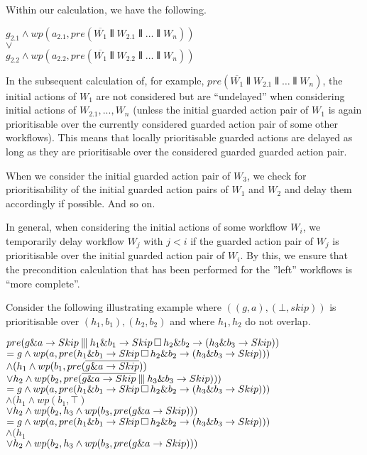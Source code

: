 \documentclass[11pt]{article}
\begin{document}
Within our calculation, we have the following. 

\noindent
$g_{2.1} \land wp(a_{2.1} , pre(\overline{W_1} \interleave W_{2.1} \interleave \dots \interleave W_n))$ \\
$\lor$ \\
$g_{2.2} \land wp(a_{2.2} , pre(\overline{W_1} \interleave W_{2.2} \interleave \dots \interleave W_n))$

In the subsequent calculation of, for example, $pre(\overline{W_1} \interleave W_{2.1} \interleave \dots \interleave W_n)$, the initial actions of $W_1$ are not considered but are ``undelayed'' when considering initial actions of $W_{2.1}, ..., W_n$ (unless the initial guarded action pair of $W_1$ is again prioritisable over the currently considered guarded action pair of some other workflows). This means that locally prioritisable guarded actions are delayed as long as they are prioritisable over the considered guarded guarded action pair.

When we consider the initial guarded action pair of $W_3$, we check for prioritisability of the initial guarded action pairs of $W_1$ and $W_2$ and delay them accordingly if possible. And so on.

In general, when considering the initial actions of some workflow $W_i$, we temporarily delay workflow $W_j$ with $j<i$ if the guarded action pair of $W_j$ is prioritisable over the initial guarded action pair of $W_i$. By this, we ensure that the precondition calculation that has been performed for the ''left'' workflows is ``more complete''.

Consider the following illustrating example where $((g,a),(\bot,skip))$ is prioritisable over $(h_1,b_1),(h_2,b_2)$ and where $h_1,h_2$ do not overlap.

\noindent
$pre(g \& a \rightarrow Skip \interleave h_1 \& b_1 \rightarrow Skip \, \Box \, h_2 \& b_2 \rightarrow (h_3 \& b_3 \rightarrow Skip))$ \\
$= g \land wp(a,pre(h_1 \& b_1 \rightarrow Skip \, \Box \, h_2 \& b_2 \rightarrow (h_3 \& b_3 \rightarrow Skip)))$ \\
$\land (h_1 \land wp(b_1,pre(\overline{g \& a \rightarrow Skip}))$ \\
\hspace*{10pt}$\lor h_2 \land wp(b_2,pre(\overline{g \& a \rightarrow Skip} \interleave h_3 \& b_3 \rightarrow Skip)))$ \\
$= g \land wp(a,pre(h_1 \& b_1 \rightarrow Skip \, \Box \, h_2 \& b_2 \rightarrow (h_3 \& b_3 \rightarrow Skip)))$ \\
$\land (h_1 \land wp(b_1,\top)$ \\
\hspace*{10pt}$\lor h_2 \land wp(b_2,h_3 \land wp(b_3,pre(g \& a \rightarrow Skip)))$ \\
$= g \land wp(a,pre(h_1 \& b_1 \rightarrow Skip \, \Box \, h_2 \& b_2 \rightarrow (h_3 \& b_3 \rightarrow Skip)))$ \\
$\land (h_1 $ \\
\hspace*{10pt}$\lor h_2 \land wp(b_2,h_3 \land wp(b_3,pre(g \& a \rightarrow Skip)))$
\end{document}

